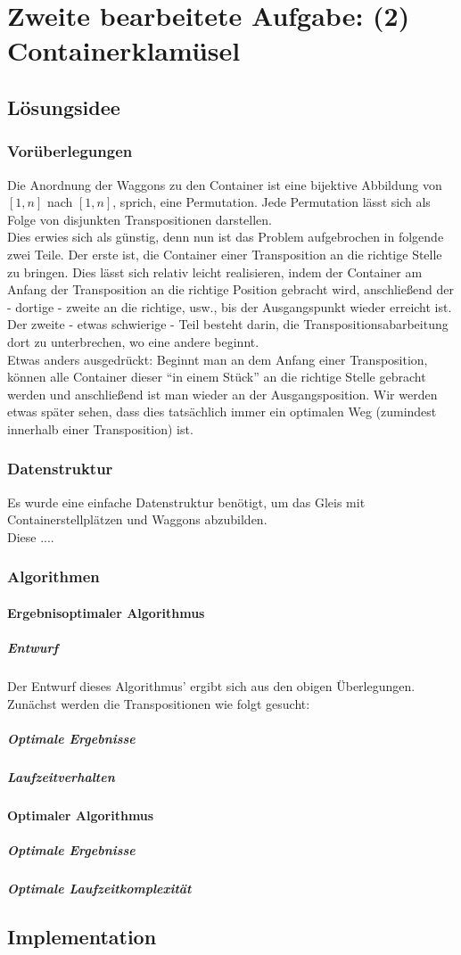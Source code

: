 \section{Zweite bearbeitete Aufgabe: (2) Containerklamüsel}
\subsection{Lösungsidee}
\subsubsection{Vorüberlegungen}
Die Anordnung der Waggons zu den Container ist eine bijektive Abbildung von $[1,n]$ nach $[1,n]$, sprich, eine Permutation.
Jede Permutation lässt sich als Folge von disjunkten Transpositionen darstellen. \\ %
Dies erwies sich als günstig, denn nun ist das Problem aufgebrochen in folgende zwei Teile.
Der erste ist, die Container einer Transposition an die richtige Stelle zu bringen.
Dies lässt sich relativ leicht realisieren, indem der Container am Anfang der Transposition an die richtige Position gebracht wird, anschließend der - dortige - zweite an die richtige, usw., bis der Ausgangspunkt wieder erreicht ist.
Der zweite - etwas schwierige - Teil besteht darin, die Transpositionsabarbeitung dort zu unterbrechen, wo eine andere beginnt. \\
Etwas anders ausgedrückt:
Beginnt man an dem Anfang einer Transposition, können alle Container dieser ``in einem Stück'' an die richtige Stelle gebracht werden und anschließend ist man wieder an der Ausgangsposition.
Wir werden etwas später sehen, dass dies tatsächlich immer ein optimalen Weg (zumindest innerhalb einer Transposition) ist.
\subsubsection{Datenstruktur}
Es wurde eine einfache Datenstruktur benötigt, um das Gleis mit Containerstellplätzen und Waggons abzubilden. \\
Diese ....
\subsubsection{Algorithmen}
\paragraph{Ergebnisoptimaler Algorithmus}
\subparagraph{Entwurf} Der Entwurf dieses Algorithmus' ergibt sich aus den obigen Überlegungen. Zunächst werden die Transpositionen wie folgt gesucht:
\subparagraph{Optimale Ergebnisse}
\subparagraph{Laufzeitverhalten} %
\paragraph{Optimaler Algorithmus}
\subparagraph{Optimale Ergebnisse}

\subparagraph{Optimale Laufzeitkomplexität}

\subsection{Implementation}
